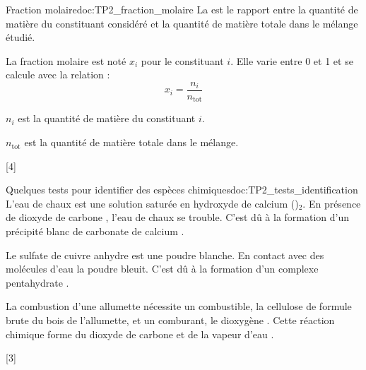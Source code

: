 \begin{doc}{Fraction molaire}{doc:TP2_fraction_molaire}
  La  est le rapport entre la quantité de matière du constituant considéré et la quantité de matière totale dans le mélange étudié.

  La fraction molaire est noté $x_i$ pour le constituant $i$. Elle varie entre 0 et 1 et se calcule avec la relation :
  \begin{equation*}
    x_i = \dfrac{n_i}{n_\text{tot}}
  \end{equation*}

  $n_i$ est la quantité de matière du constituant $i$.

  $n_\text{tot}$ est la quantité de matière totale dans le mélange.
\end{doc}

[4]


\begin{doc}{Quelques tests pour identifier des espèces chimiques}{doc:TP2_tests_identification}
  \pointCyan L'eau de chaux est une solution saturée en hydroxyde de calcium ()$_2$.
  En présence de dioxyde de carbone , l'eau de chaux se trouble. C'est dû à la formation d'un précipité blanc de carbonate de calcium .

  \pointCyan Le sulfate de cuivre anhydre  est une poudre blanche.
  En contact avec des molécules d'eau  la poudre bleuit. C'est dû à la formation d'un complexe pentahydrate .

  \pointCyan La combustion d'une allumette nécessite un combustible, la cellulose de formule brute  du bois de l'allumette, et un comburant, le dioxygène .
  Cette réaction chimique forme du dioxyde de carbone  et de la vapeur d'eau .
\end{doc}

[3]


